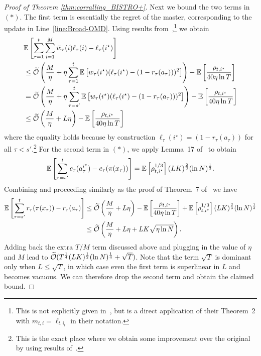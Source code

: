 \begin{proof}[Proof of Theorem \ref{thm:corralling_BISTRO+}]
Next we bound the two terms in $(*)$. 
The first term is essentially the regret of the master, corresponding to the update in Line~\ref{line:Broad-OMD}.
Using results from~\citep{wei2018more},\footnote{
This is not explicitly given in~\citep{wei2018more}, but is a direct application of their Theorem~2
with $m_{t,i} = \ell_{t,i_t}$ in their notation. 
}
we obtain
\begin{align*}
&\mathbb{E}\left[ \sum_{\tau = 1}^t \sum_{i=1}^{M} \bar{w}_\tau(i) \ell_\tau(i) -\ell_\tau(i^\star) \right] \\
&\leq \widetilde{\mathcal{O}}\left(\frac{M}{\eta} + \eta\sum_{\tau=1}^t \mathbb{E}\left[w_\tau(i^\star)(\ell_\tau(i^\star) - (1-r_\tau(a_\tau)))^2 \right]  \right) - \mathbb{E}\left[\frac{\rho_{t,i^\star}}{40\eta\ln T}\right] \\
&= \widetilde{\mathcal{O}}\left(\frac{M}{\eta} + \eta\sum_{\tau=s'}^t \mathbb{E}\left[w_\tau(i^\star)(\ell_\tau(i^\star) - (1-r_\tau(a_\tau)))^2 \right]  \right) - \mathbb{E}\left[\frac{\rho_{t,i^\star}}{40\eta\ln T}\right] \\
&\leq \widetilde{\mathcal{O}}\left(\frac{M}{\eta} +  L\eta  \right) - \mathbb{E}\left[\frac{\rho_{t,i^\star}}{40\eta\ln T}\right] 
\end{align*}
where the equality holds because by construction $\ell_\tau(i^\star) = (1-r_\tau(a_\tau))$ for all $\tau < s'$.\footnote{
This is the exact place where we obtain some improvement over the original \corral by using results of~\citep{wei2018more}.
}
For the second term in $(*)$, we apply Lemma~17 of~\citep{AgarwalLuNeSc17} to obtain
\[
\mathbb{E}\left[\sum_{\tau = s'}^t c_\tau(a_\tau^{i^\star}) - c_\tau(\pi(x_\tau))  \right] = \mathbb{E}\left[\rho_{t,i^\star}^{1/3}\right] (LK)^\frac{2}{3}(\ln N)^\frac{1}{3}.
\]
Combining and proceeding similarly as the proof of Theorem~7 of~\citep{AgarwalLuNeSc17}
we have
\begin{align*}
\mathbb{E}\left[ \sum_{\tau = s'}^t r_\tau(\pi(x_\tau)) - r_\tau(a_\tau) \right] 
&\leq \widetilde{\mathcal{O}}\left(\frac{M}{\eta} +  L\eta\right) - \mathbb{E}\left[\frac{\rho_{t,i^\star}}{40\eta\ln T}\right] + 
\mathbb{E}\left[\rho_{t,i^\star}^{1/3}\right] (LK)^\frac{2}{3}(\ln N)^\frac{1}{3}  \\
&\leq \widetilde{\mathcal{O}}\left(\frac{M}{\eta} + L\eta + LK\sqrt{\eta\ln N} \right).
\end{align*}
Adding back the extra $T/M$ term discussed above and plugging in the value of $\eta$ and $M$
lead to $\widetilde{\mathcal{O}}(T^{\frac{1}{4}}(LK)^{\frac{1}{2}}(\ln N)^{\frac{1}{4}} + \sqrt{T})$.
Note that the term $\sqrt{T}$ is dominant only when $L \leq \sqrt{T}$, in which case even the first term is superlinear in $L$ and becomes vacuous.
We can therefore drop the second term and obtain the claimed bound.
\end{proof}

